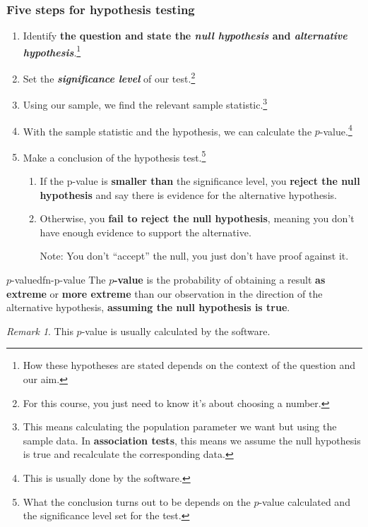 \documentclass[math,code]{amznotes}
\theoremstyle{remark}
\newtheorem*{remark}{Remark}
\begin{document}
\subsubsection{Five steps for hypothesis testing}
\begin{enumerate}
    \item Identify \textbf{the question and state the \textit{null hypothesis} and \textit{alternative hypothesis}}.\footnote{How these hypotheses are stated depends on the context of the question and our aim.}
    \item Set the \textbf{\textit{significance level}} of our test.\footnote{For this course, you just need to know it's about choosing a number.}
    \item Using our sample, we find the relevant sample statistic.\footnote{This means calculating the population parameter we want but using the sample data. In \textbf{association tests}, this means we assume the null hypothesis is true and recalculate the corresponding data.}
    \item With the sample statistic and the hypothesis, we can calculate the $p$-value.\footnote{This is usually done by the software.}
    \item Make a conclusion of the hypothesis test.\footnote{What the conclusion turns out to be depends on the $p$-value calculated and the significance level set for the test.}
    \begin{enumerate}
        \item If the p-value is \textbf{smaller than} the significance level, you \textbf{reject the null hypothesis} and say there is evidence for the alternative hypothesis.
        \item Otherwise, you \textbf{fail to reject the null hypothesis}, meaning you don’t have enough evidence to support the alternative.
        \begin{notebox}
            Note: You don’t “accept” the null, you just don’t have proof against it.
        \end{notebox}
    \end{enumerate}
\end{enumerate}
\begin{dfnbox}{$p$-value}{dfn-p-value}
    The {\color{red} \textbf{$p$-value}} is the probability of obtaining a result \textbf{as extreme} or \textbf{more extreme} than our observation in the direction of the alternative hypothesis, \textbf{assuming the null hypothesis is true}.
\end{dfnbox}
\begin{notebox}
    \begin{remark}
        This $p$-value is usually calculated by the software.
    \end{remark}
\end{notebox}
\end{document}
